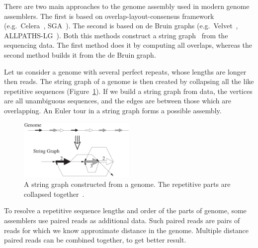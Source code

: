 There are two main approaches to the genome assembly used in modern genome assemblers. The first is based on overlap-layout-consensus framework (e.g.\ Celera~\cite{myers2000celera}, SGA~\cite{simpson2010sga}). The second is based on de Bruin graphs (e.g.\ Velvet~\cite{zerbino2008velvet}, ALLPATHS-LG~\cite{gnerre2011allpaths}). Both this methods construct a string graph~\cite{myers2005stringgraph} from the sequencing data. The first method does it by computing all overlaps, whereas the second method builds it from the de Bruin graph.

Let us consider a genome with several perfect repeats, whose lengths are longer then reads. The string graph of a genome is then created by collapsing all the like repetitive sequences (Figure~\ref{fig:string-graph}). If we build a string graph from data, the vertices are all unambiguous sequences, and the edges are between those which are overlapping. An Euler tour in a string graph forms a possible assembly.

\begin{figure}[htbp]
  \centering
  \includegraphics[width=0.5\textwidth]{../figures/string-graph.png}
  \caption[String graph]{A string graph constructed from a genome. The repetitive parts are collapsed together~\cite{myers2005stringgraph}.}\label{fig:string-graph}
\end{figure}

To resolve a repetitive sequence lengths and order of the parts of genome, some assemblers use paired reads as additional data. Such paired reads are pairs of reads for which we know approximate distance in the genome. Multiple distance paired reads can be combined together, to get better result.
